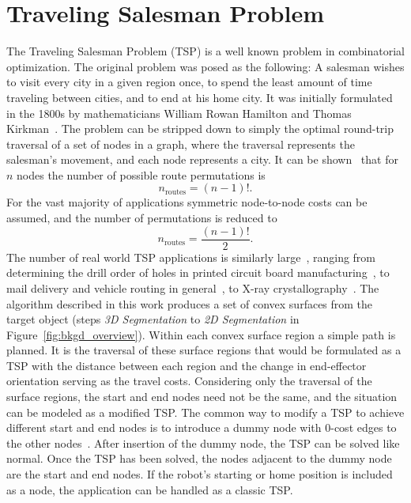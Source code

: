 \section{Traveling Salesman Problem}
The Traveling Salesman Problem (TSP) is a well known problem in combinatorial optimization.
The original problem was posed as the following:
A salesman wishes to visit every city in a given region once, to spend the least amount of time traveling between cities, and to end at his home city.
It was initially formulated in the 1800s by mathematicians William Rowan Hamilton and Thomas Kirkman~\cite{Graph_theory}.
The problem can be stripped down to simply the optimal round-trip traversal of a set of nodes in a graph, where the traversal represents the salesman's movement, and each node represents a city.
It can be shown~\cite{TSP_in_pursuit_of} that for $n$ nodes the number of possible route permutations is
\begin{equation*}
	n_{\text{routes}} = (n-1)!.
\end{equation*}
For the vast majority of applications symmetric node-to-node costs can be assumed, and the number of permutations is reduced to
\begin{equation*}
	n_{\text{routes}} = \frac{(n-1)!}{2}.
\end{equation*}
The number of real world TSP applications is similarly large~\cite{TSP_theory_applications}, ranging from determining the drill order of holes in printed circuit board manufacturing~\cite{TSP_PCB_manufacturing}, to mail delivery and vehicle routing in general~\cite{TSP_mail_delivery}, to X-ray crystallography~\cite{TSP_xray_crystallography}.
The algorithm described in this work produces a set of convex surfaces from the target object (steps \textit{3D Segmentation} to \textit{2D Segmentation} in Figure~\ref{fig:bkgd_overview}).
Within each convex surface region a simple path is planned.
It is the traversal of these surface regions that would be formulated as a TSP with the distance between each region and the change in end-effector orientation serving as the travel costs.
Considering only the traversal of the surface regions, the start and end nodes need not be the same, and the situation can be modeled as a modified TSP.
The common way to modify a TSP to achieve different start and end nodes is to introduce a dummy node with 0-cost edges to the other nodes~\cite{TSP_dummy_node_mod}.
After insertion of the dummy node, the TSP can be solved like normal.
Once the TSP has been solved, the nodes adjacent to the dummy node are the start and end nodes.
If the robot's starting or home position is included as a node, the application can be handled as a classic TSP.

